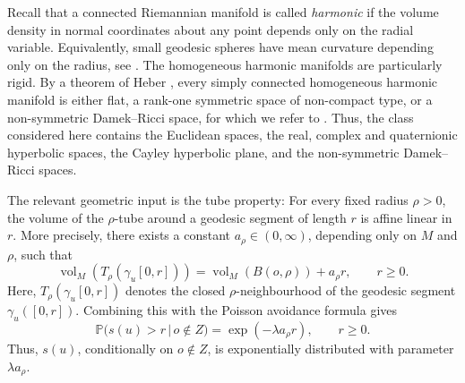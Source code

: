 \documentclass[11pt,a4paper]{article}
\theoremstyle{plain}
\theoremstyle{definition}
\theoremstyle{remark}
\newcommand{\vol}{\mathop{\mathrm{vol}}\nolimits}
\def\PP{\mathbb{P}}
\begin{document}
Recall that a connected Riemannian manifold is called \emph{harmonic} if the volume density in normal coordinates about any point depends only on the radial variable. Equivalently, small geodesic spheres have mean curvature depending only on the radius, see \cite{GrayBook,KnieperSurvey}. The homogeneous harmonic manifolds are particularly rigid. By a theorem of Heber \cite{HeberHarmonicHomogeneous}, every simply connected homogeneous harmonic manifold is either flat, a rank-one symmetric space of non-compact type, or a non-symmetric Damek--Ricci space, for which we refer to \cite{DRSpaces}. Thus, the class considered here contains the Euclidean spaces, the real, complex and quaternionic hyperbolic spaces, the Cayley hyperbolic plane, and the non-symmetric Damek--Ricci spaces.

The relevant geometric input is the tube property: For every fixed radius \(\rho>0\), the volume of the \(\rho\)-tube around a geodesic segment of length \(r\) is affine linear in \(r\). More precisely, there exists a constant \(a_\rho\in(0,\infty)\), depending only on \(M\) and \(\rho\), such that
\[
\vol_M(T_\rho(\gamma_u[0,r]))
=
\vol_M(B(o,\rho))+a_\rho r,
\qquad r\geq 0.
\]
Here, \(T_\rho(\gamma_u[0,r])\) denotes the closed \(\rho\)-neighbourhood of the geodesic segment \(\gamma_u([0,r])\).
Combining this with the Poisson avoidance formula gives
\[
\PP\bigl(s(u)>r\,\big|\,o\notin Z\bigr)
=
\exp(-\lambda a_\rho r),
\qquad r\geq 0.
\]
Thus, \(s(u)\), conditionally on \(o\notin Z\), is exponentially distributed with parameter \(\lambda a_\rho\).
\end{document}
